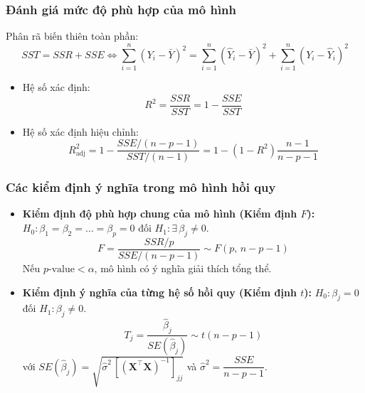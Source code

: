 \documentclass[12pt,a4paper]{article}
\begin{document}
\subsubsection{Đánh giá mức độ phù hợp của mô hình}

Phân rã biến thiên toàn phần:
\begin{equation}
  SST = SSR + SSE \iff
  \sum_{i=1}^{n}(Y_i - \bar{Y})^2 = \sum_{i=1}^{n}(\hat{Y}_i - \bar{Y})^2 + \sum_{i=1}^{n}(Y_i - \hat{Y}_i)^2
\end{equation}
\begin{itemize}
  \item Hệ số xác định:
  \begin{equation}
    R^2 = \frac{SSR}{SST} = 1 - \frac{SSE}{SST}
  \end{equation}
  \item Hệ số xác định hiệu chỉnh:
  \begin{equation}
    R^2_{\text{adj}} = 1 - \frac{SSE/(n-p-1)}{SST/(n-1)} = 1 - (1-R^2)\frac{n-1}{n-p-1}
  \end{equation}
\end{itemize}

\subsubsection{Các kiểm định ý nghĩa trong mô hình hồi quy}
\begin{itemize}
  \item \textbf{Kiểm định độ phù hợp chung của mô hình (Kiểm định $F$):}
  $H_0: \beta_1 = \beta_2 = \dots = \beta_p = 0$ đối $H_1: \exists\,\beta_j \ne 0$.
  \begin{equation}
    F = \frac{SSR/p}{SSE/(n-p-1)} \sim F(p,\, n-p-1)
  \end{equation}
  Nếu $p\text{-value} < \alpha$, mô hình có ý nghĩa giải thích tổng thể.
  \item \textbf{Kiểm định ý nghĩa của từng hệ số hồi quy (Kiểm định $t$):}
  $H_0: \beta_j = 0$ đối $H_1: \beta_j \ne 0$.
  \begin{equation}
    T_j = \frac{\hat{\beta}_j}{SE(\hat{\beta}_j)} \sim t(n-p-1)
  \end{equation}
  với $SE(\hat{\beta}_j) = \sqrt{\hat{\sigma}^2\,[(\mathbf{X}^\top\mathbf{X})^{-1}]_{jj}}$ và
  $\hat{\sigma}^2 = \dfrac{SSE}{n-p-1}$.
\end{itemize}
\end{document}
